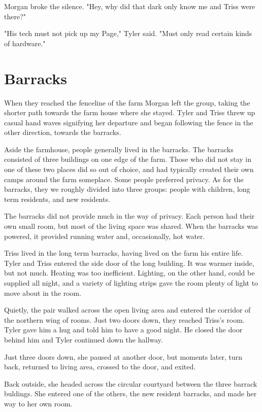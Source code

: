 \documentclass[courier]{sffms}
\begin{document}
Morgan broke the silence. "Hey, why did that
dark only know me and Triss were there?"

"His tech must not pick up my Page,"
Tyler said. "Must only read certain kinds
of hardware."

\chapter{Barracks}
When they reached the fenceline of the farm
Morgan left the group, taking the shorter
path towards the farm house where she
stayed. Tyler and Triss threw up casual
hand waves signifying her departure and began
following the fence in the other direction, towards
the barracks.

Aside the farmhouse, people generally lived
in the barracks. The barracks consisted of three
buildings on one edge of the farm. Those who
did not stay in one of these two places did so
out of choice, and had typically created their
own camps around the farm someplace. Some
people preferred privacy. As for the barracks,
they we roughly divided into three groups:
people with children, long term residents, and
new residents.

The barracks did not provide much in the way
of privacy. Each person had their own small
room, but most of the living space was shared.
When the barracks was powered, it provided
running water and, occasionally, hot water.

Triss lived in the long term barracks, having lived
on the farm his entire life. Tyler and Triss entered
the side door of the long building. It was warmer
inside, but not much. Heating was too inefficient.
Lighting, on the other hand, could be supplied
all night, and a variety of lighting strips gave
the room plenty of light to move about in the room.

Quietly, the pair walked across the open living
area and entered the corridor of the 
northern wing of rooms. Just two doors down,
they reached Triss's room. Tyler gave him a hug
and told him to have a good night. He closed the
door behind him and Tyler continued down the
hallway.

Just three doors down, she paused at another
door, but moments later, turn back, returned to
living area, crossed to the door, and exited.

Back outside, she headed across the circular
courtyard between the three barrack buldings.
She entered one of the others, the new resident
barracks, and made her way to her own room.
\end{document}

